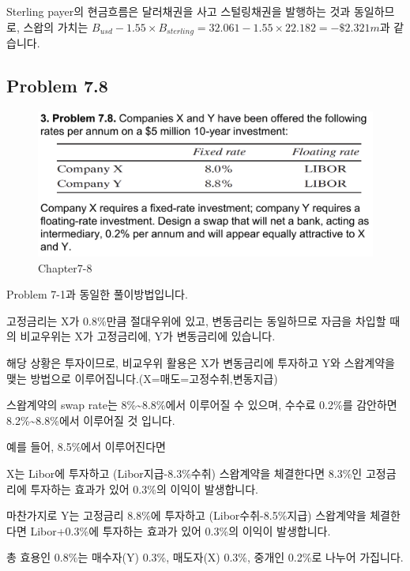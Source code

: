 \documentclass[
  letterpaper,
  DIV=11,
  numbers=noendperiod]{scrreprt}
\begin{document}
Sterling payer의 현금흐름은 달러채권을 사고 스털링채권을 발행하는 것과
동일하므로, 스왑의 가치는
\(B_{usd}-1.55\times B_{sterling}=32.061-1.55\times 22.182=-\$2.321m\)과
같습니다.

\subsection*{\texorpdfstring{\textbf{Problem
7.8}}{Problem 7.8}}\label{problem-7.8}

\begin{figure}[H]

{\centering \includegraphics{images/선물옵션_7-8.png}

}

\caption{Chapter7-8}

\end{figure}%

Problem 7-1과 동일한 풀이방법입니다.

고정금리는 X가 0.8\%만큼 절대우위에 있고, 변동금리는 동일하므로 자금을
차입할 때의 비교우위는 X가 고정금리에, Y가 변동금리에 있습니다.

해당 상황은 투자이므로, 비교우위 활용은 X가 변동금리에 투자하고 Y와
스왑계약을 맺는 방법으로 이루어집니다.(X=매도=고정수취,변동지급)

스왑계약의 swap rate는 8\%\textasciitilde8.8\%에서 이루어질 수 있으며,
수수료 0.2\%를 감안하면 8.2\%\textasciitilde8.8\%에서 이루어질 것
입니다.

예를 들어, 8.5\%에서 이루어진다면

X는 Libor에 투자하고 (Libor지급-8.3\%수취) 스왑계약을 체결한다면 8.3\%인
고정금리에 투자하는 효과가 있어 0.3\%의 이익이 발생합니다.

마찬가지로 Y는 고정금리 8.8\%에 투자하고 (Libor수취-8.5\%지급)
스왑계약을 체결한다면 Libor+0.3\%에 투자하는 효과가 있어 0.3\%의 이익이
발생합니다.

총 효용인 0.8\%는 매수자(Y) 0.3\%, 매도자(X) 0.3\%, 중개인 0.2\%로
나누어 가집니다.
\end{document}
